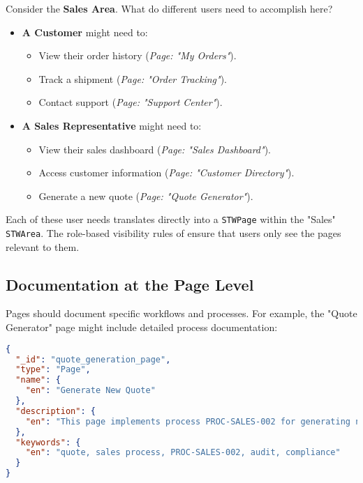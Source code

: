 Consider the \textbf{Sales Area}. What do different users need to accomplish here?
\begin{itemize}
    \item \textbf{A Customer} might need to:
        \begin{itemize}
            \item View their order history (\textit{Page: "My Orders"}).
            \item Track a shipment (\textit{Page: "Order Tracking"}).
            \item Contact support (\textit{Page: "Support Center"}).
        \end{itemize}
    \item \textbf{A Sales Representative} might need to:
        \begin{itemize}
            \item View their sales dashboard (\textit{Page: "Sales Dashboard"}).
            \item Access customer information (\textit{Page: "Customer Directory"}).
            \item Generate a new quote (\textit{Page: "Quote Generator"}).
        \end{itemize}
\end{itemize}

Each of these user needs translates directly into a \texttt{STWPage} within the "Sales" \texttt{STWArea}. The role-based visibility rules of \wbdl{} ensure that users only see the pages relevant to them.

\subsection{Documentation at the Page Level}
\label{sec:page-documentation}

Pages should document specific workflows and processes. For example, the "Quote Generator" page might include detailed process documentation:

\begin{lstlisting}[language=JSON,caption={Page with Process Documentation},label={lst:process-page-docs}]
{
  "_id": "quote_generation_page",
  "type": "Page",
  "name": {
    "en": "Generate New Quote"
  },
  "description": {
    "en": "This page implements process PROC-SALES-002 for generating new customer quotes. The process requires completion of the customer information form and selection of products from the official catalog. All generated quotes must be approved by a sales manager before being sent to the customer. This process is audited quarterly under audit procedure AUD-Q-004."
  },
  "keywords": {
    "en": "quote, sales process, PROC-SALES-002, audit, compliance"
  }
}
\end{lstlisting}

